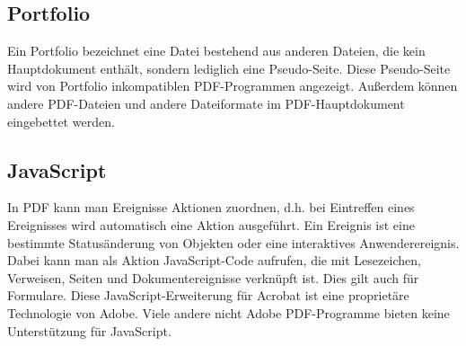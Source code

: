 \subsection{Portfolio}
Ein Portfolio bezeichnet eine Datei bestehend aus anderen Dateien, die kein Hauptdokument enthält, sondern lediglich eine Pseudo-Seite. Diese Pseudo-Seite wird von Portfolio inkompatiblen PDF-Programmen angezeigt. Außerdem können andere PDF-Dateien und andere Dateiformate im PDF-Hauptdokument eingebettet werden. \cite{softx}

\subsection{JavaScript}
In PDF kann man Ereignisse Aktionen zuordnen, d.h. bei Eintreffen eines Ereignisses wird automatisch eine Aktion ausgeführt. Ein Ereignis ist eine bestimmte Statusänderung von Objekten oder eine interaktives Anwenderereignis. Dabei kann man als Aktion JavaScript-Code aufrufen, die mit Lesezeichen, Verweisen, Seiten und Dokumentereignisse verknüpft ist. Dies gilt auch für Formulare. \cite{softx} Diese JavaScript-Erweiterung für Acrobat ist eine proprietäre Technologie von Adobe. Viele andere nicht Adobe PDF-Programme bieten keine Unterstützung für JavaScript. \cite{wiki-pdf-engl}